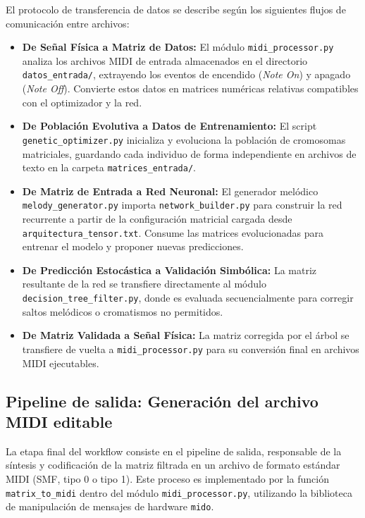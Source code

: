 El protocolo de transferencia de datos se describe según los siguientes flujos de comunicación entre archivos:
\begin{itemize}
    \item \textbf{De Señal Física a Matriz de Datos:} El módulo \texttt{midi\_processor.py} analiza los archivos MIDI de entrada almacenados en el directorio \texttt{datos\_entrada/}, extrayendo los eventos de encendido (\textit{Note On}) y apagado (\textit{Note Off}). Convierte estos datos en matrices numéricas relativas compatibles con el optimizador y la red.
    \item \textbf{De Población Evolutiva a Datos de Entrenamiento:} El script \texttt{genetic\_optimizer.py} inicializa y evoluciona la población de cromosomas matriciales, guardando cada individuo de forma independiente en archivos de texto en la carpeta \texttt{matrices\_entrada/}.
    \item \textbf{De Matriz de Entrada a Red Neuronal:} El generador melódico \texttt{melody\_generator.py} importa \texttt{network\_builder.py} para construir la red recurrente a partir de la configuración matricial cargada desde \texttt{arquitectura\_tensor.txt}. Consume las matrices evolucionadas para entrenar el modelo y proponer nuevas predicciones.
    \item \textbf{De Predicción Estocástica a Validación Simbólica:} La matriz resultante de la red se transfiere directamente al módulo \texttt{decision_tree_filter.py}, donde es evaluada secuencialmente para corregir saltos melódicos o cromatismos no permitidos.
    \item \textbf{De Matriz Validada a Señal Física:} La matriz corregida por el árbol se transfiere de vuelta a \texttt{midi\_processor.py} para su conversión final en archivos MIDI ejecutables.
\end{itemize}

\subsection{Pipeline de salida: Generación del archivo MIDI editable}

La etapa final del workflow consiste en el pipeline de salida, responsable de la síntesis y codificación de la matriz filtrada en un archivo de formato estándar MIDI (SMF, tipo 0 o tipo 1). Este proceso es implementado por la función \texttt{matrix\_to\_midi} dentro del módulo \texttt{midi\_processor.py}, utilizando la biblioteca de manipulación de mensajes de hardware \texttt{mido}.

